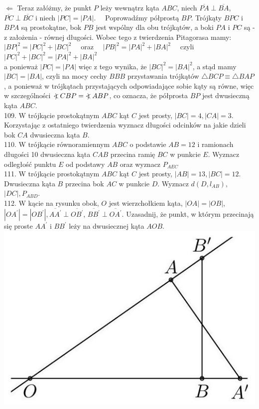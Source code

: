 \documentclass[10pt]{article}
\newcommand\Varangle{\mathop{{<\!\!\!\!\!\text{\small)}}\:}\nolimits}
\begin{document}
\(\Longleftarrow\) Teraz załóżmy, że punkt \(P\) leży wewnątrz kąta \(A B C\), niech \(\overline{P A} \perp \overline{B A}\), \(\overline{P C} \perp \overline{B C}\) i niech \(|P C|=|P A| . \quad\) Poprowadźmy półprostą \(B P\). Trójkąty \(B P C\) i \(B P A\) są prostokątne, bok \(P B\) jest wspólny dla obu trójkątów, a boki \(P A\) i \(P C\) są - z założenia - równej długości. Wobec tego z twierdzenia Pitagorasa mamy:\\
\(|B P|^{2}=|P C|^{2}+|B C|^{2} \quad\) oraz \(\quad|P B|^{2}=|P A|^{2}+|B A|^{2} \quad\) czyli \(|P C|^{2}+|B C|^{2}=|P A|^{2}+|B A|^{2}\)\\
a ponieważ \(|P C|=|P A|\) więc z tego wynika, że \(|B C|^{2}=|B A|^{2}\), a stąd mamy \(|B C|=|B A|\), czyli na mocy cechy \(B B B\) przystawania trójkątów \(\triangle B C P \equiv \triangle B A P\), a ponieważ w trójkątach przystających odpowiadające sobie kąty są równe, więc w szczególności \(\Varangle C B P=\Varangle A B P\), co oznacza, że półprosta \(B P\) jest dwusieczną kąta \(A B C\).\\
109. W trójkącie prostokątnym \(A B C\) kąt \(C\) jest prosty, \(|B C|=4,|C A|=3\). Korzystając z ostatniego twierdzenia wyznacz długości odcinków na jakie dzieli bok \(C A\) dwusieczna kąta \(B\).\\
110. W trójkącie równoramiennym \(A B C\) o podstawie \(A B=12\) i ramionach długości 10 dwusieczna kąta \(C A B\) przecina ramię \(B C\) w punkcie \(E\). Wyznacz odległość punktu \(E\) od podstawy \(A B\) oraz wyznacz \(P_{A E C}\)\\
111. W trójkącie prostokątnym \(A B C\) kąt \(C\) jest prosty, \(|A B|=13,|B C|=12\). Dwusieczna kąta \(B\) przecina bok \(A C\) w punkcie \(D\). Wyznacz \(d\left(D, l_{A B}\right)\), \(|D C|, P_{A B D}\).\\
112. W kącie na rysunku obok, \(O\) jest wierzchołkiem kąta, \(|O A|=|O B|\), \(\left|O A^{\prime}\right|=\left|O B^{\prime}\right|, \overline{A A^{\prime}} \perp \overline{O B^{\prime}}\), \(\overline{B B^{\prime}} \perp \overline{O A^{\prime}}\). Uzasadnij, że punkt, w którym przecinają się proste \(A A^{\prime}\) i \(B B^{\prime}\) leży na dwusiecznej kąta \(A O B\).\\
\includegraphics[max width=\textwidth, center]{2024_11_21_71f62bd117d375398909g-142}\\
\end{document}
